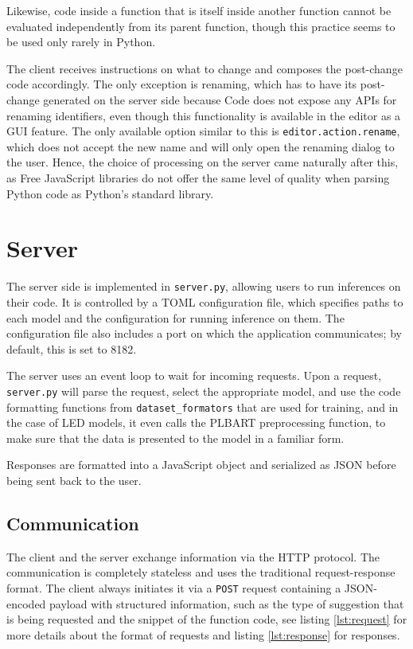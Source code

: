             Likewise, code inside a function that is itself inside another function cannot be evaluated independently from its parent function, though this practice seems to be used only rarely in Python.
            
            The client receives instructions on what to change and composes the post-change code accordingly. The only exception is renaming, which has to have its post-change generated on the server side because Code does not expose any APIs for renaming identifiers, even though this functionality is available in the editor as a GUI feature. The only available option similar to this is \texttt{editor.action.rename}, which does not accept the new name and will only open the renaming dialog to the user. Hence, the choice of processing on the server came naturally after this, as Free JavaScript libraries do not offer the same level of quality when parsing Python code as Python's standard library.
            
    \section{Server}
        The server side is implemented in \texttt{server.py}, allowing users to run inferences on their code. It is controlled by a TOML configuration file, which specifies paths to each model and the configuration for running inference on them. The configuration file also includes a port on which the application communicates; by default, this is set to 8182.
        
        The server uses an event loop to wait for incoming requests. Upon a request, \texttt{server.py} will parse the request, select the appropriate model, and use the code formatting functions from \texttt{dataset\_formators} that are used for training, and in the case of LED models, it even calls the PLBART preprocessing function, to make sure that the data is presented to the model in a familiar form. 

        Responses are formatted into a JavaScript object and serialized as JSON before being sent back to the user.
        
\subsection{Communication}
    The client and the server exchange information via the HTTP protocol. The communication is completely stateless and uses the traditional request-response format. The client always initiates it via a \texttt{POST} request containing a JSON-encoded payload with structured information, such as the type of suggestion that is being requested and the snippet of the function code, see listing \ref{lst:request} for more details about the format of requests and listing \ref{lst:response} for responses.  
    
